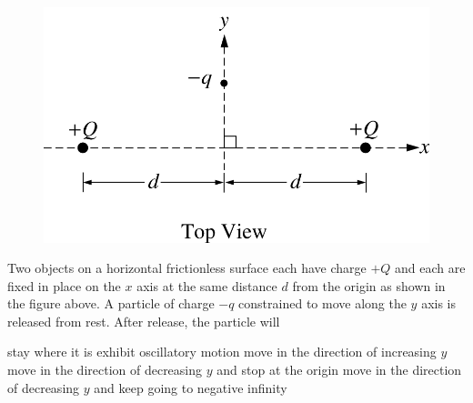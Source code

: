\begin{figure}[H]
    \center
    \includegraphics[scale=0.25]{images/img-007-016.png}
\end{figure}

\begin{questions}\setcounter{question}{18}\question
Two objects on a horizontal frictionless surface each have charge $+Q$ and each are fixed in place on the $x$ axis at the same distance $d$ from the origin as shown in the figure above. A particle of charge $-q$ constrained to move along the $y$ axis is released from rest. After release, the particle will

\begin{choices}
\choice stay where it is
\choice exhibit oscillatory motion
\choice move in the direction of increasing $y$
\choice move in the direction of decreasing $y$ and stop at the origin
\choice move in the direction of decreasing $y$ and keep going to negative infinity
\end{choices}\end{questions}

